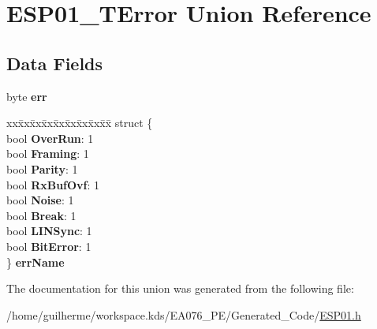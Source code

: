 \hypertarget{union_e_s_p01___t_error}{}\section{E\+S\+P01\+\_\+\+T\+Error Union Reference}
\label{union_e_s_p01___t_error}
\subsection*{Data Fields}
\begin{DoxyCompactItemize}
\item 
\mbox{\label{union_e_s_p01___t_error_ad1d2e23b5b98d2e4cf27499b1a0203ec}} 
byte {\bfseries err}
\item 
\mbox{\label{union_e_s_p01___t_error_a724992b745b70f0efd59444a8185c880}} 
\begin{tabbing}
xx\=xx\=xx\=xx\=xx\=xx\=xx\=xx\=xx\=\kill
struct \{\\
\>bool {\bfseries OverRun}: 1\\
\>bool {\bfseries Framing}: 1\\
\>bool {\bfseries Parity}: 1\\
\>bool {\bfseries RxBufOvf}: 1\\
\>bool {\bfseries Noise}: 1\\
\>bool {\bfseries Break}: 1\\
\>bool {\bfseries LINSync}: 1\\
\>bool {\bfseries BitError}: 1\\
\} {\bfseries errName}\\

\end{tabbing}\end{DoxyCompactItemize}


The documentation for this union was generated from the following file\+:\begin{DoxyCompactItemize}
\item 
/home/guilherme/workspace.\+kds/\+E\+A076\+\_\+\+P\+E/\+Generated\+\_\+\+Code/\hyperlink{_e_s_p01_8h}{E\+S\+P01.\+h}\end{DoxyCompactItemize}
